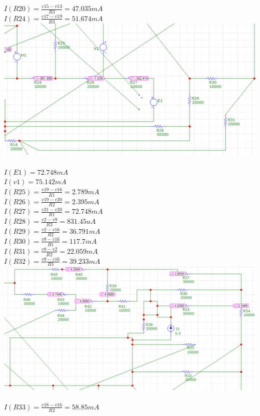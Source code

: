\documentclass{article}
\begin{document}
$I(R20) = \frac{v15-v13}{R3} = 47.035m A$\\ 
$I(R24) = \frac{v17-v19}{R3} = 51.674m A$\\ 
\includegraphics[]{images/MicroCap3_75.PNG}\\ \\
$I(E1) = 72.748m A$\\
$I(v1) = 75.142m A$\\
$I(R25) = \frac{v19-v16}{R1} = 2.789m A$\\ 
$I(R26) = \frac{v19-v20}{R2} = 2.395m A$\\ 
$I(R27) = \frac{v21-v20}{R1} = 72.748m A$\\ 
$I(R28) = \frac{v2-v9}{R3} = 831.45u A$\\ 
$I(R29) = \frac{v2-v16}{R2} = 36.791m A$\\ 
$I(R30) = \frac{v8-v16}{R1} = 117.7m A$\\ 
$I(R31) = \frac{v8-v2}{R2} = 22.059m A$\\ 
$I(R32) = \frac{v8-v16}{R3} = 39.233m A$\\ 
\includegraphics[]{images/MicroCap4_75.PNG}\\ \\
$I(R33) = \frac{v18-v16}{R2} = 58.85m A$\\ 
\end{document}
